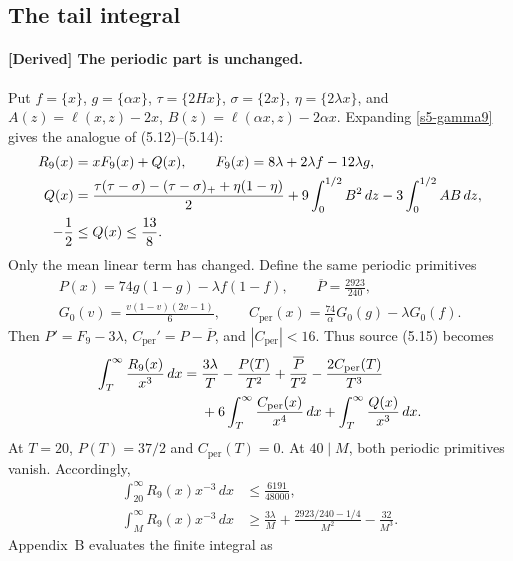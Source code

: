 \subsection{The tail integral}
\label{s5-tail}

\paragraph{[Derived] The periodic part is unchanged.}
Put $f=\{x\}$, $g=\{\alpha x\}$, $\tau=\{2Hx\}$,
$\sigma=\{2x\}$, $\eta=\{2\lambda x\}$, and
$A(z)=\ell(x,z)-2x$, $B(z)=\ell(\alpha x,z)-2\alpha x$.
Expanding \eqref{s5-gamma9} gives the analogue of (5.12)--(5.14):
\begin{align}
 R_9(x)&=xF_9(x)+Q(x),\qquad
 F_9(x)=8\lambda+2\lambda f-12\lambda g,\notag\\
 Q(x)&=\frac{\tau(\tau-\sigma)-(\tau-\sigma)_+
                     +\eta(1-\eta)}2
       +9\int_0^{1/2}B^2\,dz-3\int_0^{1/2}AB\,dz,
 \label{s5-tail-decomposition}\\
 -\frac12&\leq Q(x)\leq\frac{13}{8}.\notag
\end{align}
Only the mean linear term has changed.  Define the same periodic primitives
\begin{gather*}
 P(x)=74g(1-g)-\lambda f(1-f),\qquad \overline P=\frac{2923}{240},\\
 G_0(v)=\frac{v(1-v)(2v-1)}6,\qquad
 C_{\mathrm{per}}(x)=\frac{74}{\alpha}G_0(g)-\lambda G_0(f).
\end{gather*}
Then $P'=F_9-3\lambda$, $C_{\mathrm{per}}'=P-\overline P$, and
$|C_{\mathrm{per}}|<16$.  Thus source (5.15) becomes
\begin{align}
 \int_T^\infty\frac{R_9(x)}{x^3}\,dx
 ={}&\frac{3\lambda}{T}-\frac{P(T)}{T^2}
       +\frac{\overline P}{T^2}
       -\frac{2C_{\mathrm{per}}(T)}{T^3}\notag\\
 &+6\int_T^\infty\frac{C_{\mathrm{per}}(x)}{x^4}\,dx
       +\int_T^\infty\frac{Q(x)}{x^3}\,dx.
 \label{s5-tail-identity}
\end{align}
At $T=20$, $P(T)=37/2$ and $C_{\mathrm{per}}(T)=0$.  At $40\mid M$,
both periodic primitives vanish.  Accordingly,
\begin{align}
 \int_{20}^\infty R_9(x)x^{-3}\,dx&\leq\frac{6191}{48000},
 \label{s5-tail-upper}\\
 \int_M^\infty R_9(x)x^{-3}\,dx&\geq\frac{3\lambda}{M}
       +\frac{2923/240-1/4}{M^2}-\frac{32}{M^3}.
 \label{s5-tail-lower}
\end{align}
Appendix~B evaluates the finite integral as

